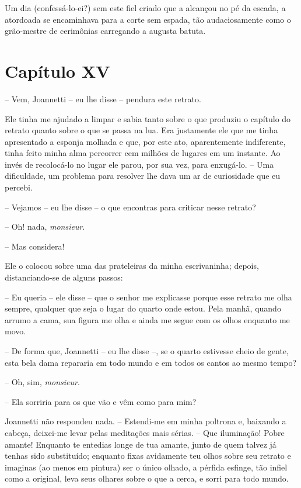 Um dia (confessá-lo-ei?) sem este fiel criado que a alcançou no pé da
escada, a atordoada se encaminhava para a corte sem espada, tão
audaciosamente como o grão-mestre de cerimônias carregando a augusta
batuta.

\section*{Capítulo XV}

 -- Vem, Joannetti -- eu lhe disse -- pendura este retrato.

 Ele tinha me ajudado a limpar e sabia tanto sobre o que produziu o
capítulo do retrato quanto sobre o que se passa na lua. Era justamente
ele que me tinha apresentado a esponja molhada e que, por este ato,
aparentemente indiferente, tinha feito minha alma percorrer cem milhões
de lugares em um instante. Ao invés de recolocá-lo no lugar ele parou,
por sua vez, para enxugá-lo. -- Uma dificuldade, um problema para
resolver lhe dava um ar de curiosidade que eu percebi. 

 -- Vejamos -- eu lhe disse -- o que encontras para criticar nesse
retrato?

 -- Oh! nada, \textit{monsieur}. 

-- Mas considera!

Ele o colocou sobre uma das prateleiras da minha escrivaninha; depois,
distanciando-se de alguns passos:

-- Eu queria -- ele disse -- que o senhor me explicasse porque esse
retrato me olha sempre, qualquer que seja o lugar do quarto onde estou.
Pela manhã, quando arrumo a cama, sua figura me olha e ainda me segue
com os olhos enquanto me movo.

-- De forma que, Joannetti -- eu lhe disse --, se o quarto estivesse
cheio de gente, esta bela dama repararia em todo mundo e em todos os
cantos ao mesmo tempo? 

-- Oh, sim, \textit{monsieur}.

-- Ela sorriria para os que vão e vêm como para mim?

Joannetti não respondeu nada. -- Estendi-me em minha poltrona e,
baixando a cabeça, deixei-me levar pelas meditações mais sérias. --
Que iluminação! Pobre amante! Enquanto te entedias longe de tua amante,
junto de quem talvez já tenhas sido substituído; enquanto fixas
avidamente teu olhos sobre seu retrato e imaginas (ao menos em pintura)
ser o único olhado, a pérfida esfinge, tão infiel como a original, leva
seus olhares sobre o que a cerca, e sorri para todo mundo. 


